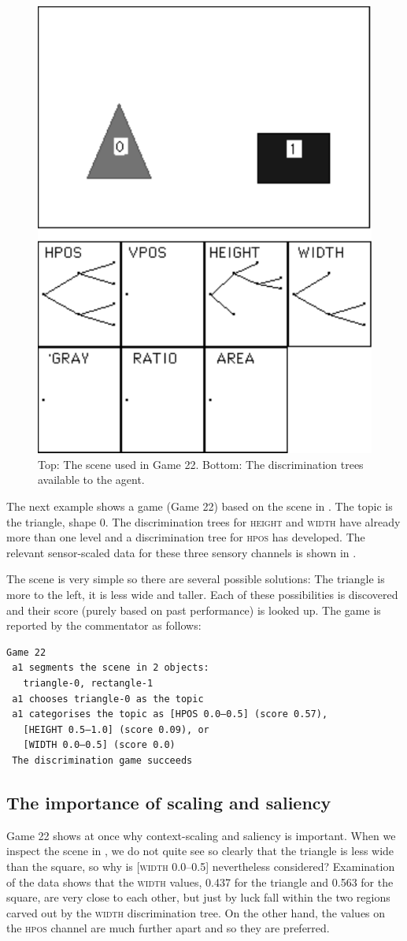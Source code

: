 \begin{figure}[htbp]
  \centerline{\includegraphics[width=.40\textwidth]{chap4/figs/scene22.pdf}}
\caption{\label{scene3}Top: The scene used in Game 22. 
Bottom: The discrimination trees available to the
agent.}
\end{figure}

The next example shows a game (Game 22) based on the scene 
in . The topic is the triangle, shape 0. 
The discrimination trees for 
\textsc{height} and \textsc{width} have already more than one level and 
a discrimination tree for \textsc{hpos} has developed.
The relevant sensor-scaled data for these three sensory
channels is shown in . 

The scene is very simple so there are several possible
solutions: The triangle is more to the left, it is less wide 
and taller. Each of these possibilities is discovered
and their score (purely based on past performance) is 
looked up. The game is reported by the commentator
as follows: 
\begin{verbatim}
Game 22
 a1 segments the scene in 2 objects:  
   triangle-0, rectangle-1
 a1 chooses triangle-0 as the topic 
 a1 categorises the topic as [HPOS 0.0–0.5] (score 0.57), 
   [HEIGHT 0.5–1.0] (score 0.09), or 
   [WIDTH 0.0–0.5] (score 0.0) 
 The discrimination game succeeds
\end{verbatim}

\subsection{The importance of scaling and saliency}

Game 22 shows at once why context-scaling 
and saliency is important. When we inspect the scene in 
, we do not quite see so clearly 
that the triangle is less wide than the square, so why
is [\textsc{width} 0.0–0.5] 
nevertheless considered? Examination of the data shows
that the \textsc{width} values, 0.437 for the triangle
and 0.563 for the square, are very close 
to each other, but just by luck fall within 
the two regions carved out by the \textsc{width} discrimination
tree. On the other hand, the values on the \textsc{hpos} channel 
are much further apart and so they are preferred. 

